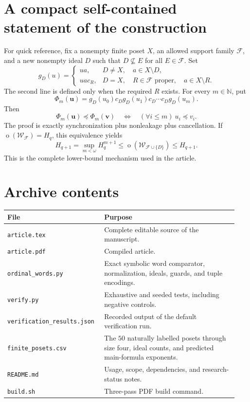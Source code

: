 \documentclass[11pt]{article}
\numberwithin{equation}{section}
\theoremstyle{plain}
\theoremstyle{definition}
\theoremstyle{remark}
\newcommand{\ot}{\operatorname{o}}
\newcommand{\F}{\mathcal F}
\newcommand{\W}{\mathcal W}
\newcommand{\HH}{H}
\newcommand{\N}{\mathbb N}
\newcommand{\sub}{\preccurlyeq}
\begin{document}
\appendix
\section{A compact self-contained statement of the construction}

For quick reference, fix a nonempty finite poset $X$, an allowed support family $\F$, and a new nonempty ideal $D$ such that $D\nsubseteq E$ for all $E\in\F$. Set
\[
 g_D(u)=
 \begin{cases}
  ua,&D\neq X,\quad a\in X\setminus D,\\
  ua c_R,&D=X,\quad R\in\F\text{ proper},\quad a\in X\setminus R.
 \end{cases}
\]
The second line is defined only when the required $R$ exists. For every $m\in\N$, put
\[
 \Phi_m(\mathbf u)
  =g_D(u_0)c_D g_D(u_1)c_D\cdots c_D g_D(u_m).
\]
Then
\[
 \boxed{\quad
 \Phi_m(\mathbf u)\sub\Phi_m(\mathbf v)
 \quad\Longleftrightarrow\quad
 (\forall i\leq m)\ u_i\sub v_i.
 \quad}
\]
The proof is exactly synchronization plus nonleakage plus cancellation. If $\ot(\W_\F)=\HH_q$, this equivalence yields
\[
 \HH_{q+1}
 =\sup_{m<\omega}\HH_q^{m+1}
 \leq\ot(\W_{\F\cup\{D\}})
 \leq\HH_{q+1}.
\]
This is the complete lower-bound mechanism used in the article.

\clearpage
\section{Archive contents}

\begin{longtable}{@{}p{0.38\linewidth}p{0.56\linewidth}@{}}
\toprule
File & Purpose\\
\midrule
\endhead
\texttt{article.tex} & Complete editable source of the manuscript.\\
\texttt{article.pdf} & Compiled article.\\
\texttt{ordinal\_words.py} & Exact symbolic word comparator, normalization, ideals, guards, and tuple encodings.\\
\texttt{verify.py} & Exhaustive and seeded tests, including negative controls.\\
\texttt{verification\_results.json} & Recorded output of the default verification run.\\
\texttt{finite\_posets.csv} & The $50$ naturally labelled posets through size four, ideal counts, and predicted main-formula exponents.\\
\texttt{README.md} & Usage, scope, dependencies, and research-status notes.\\
\texttt{build.sh} & Three-pass PDF build command.\\
\bottomrule
\end{longtable}
\end{document}
